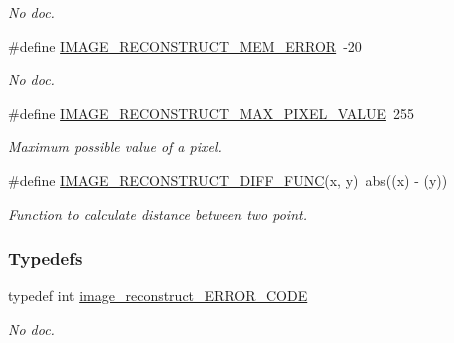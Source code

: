 \begin{DoxyCompactItemize}
\begin{DoxyCompactList}\small\item\em No doc. \end{DoxyCompactList}\item 
\hypertarget{a00013_a1c03d3ba5b3e6e762312da626f27927b}{\#define \hyperlink{a00013_a1c03d3ba5b3e6e762312da626f27927b}{I\-M\-A\-G\-E\-\_\-\-R\-E\-C\-O\-N\-S\-T\-R\-U\-C\-T\-\_\-\-M\-E\-M\-\_\-\-E\-R\-R\-O\-R}~-\/20}\label{a00013_a1c03d3ba5b3e6e762312da626f27927b}

\begin{DoxyCompactList}\small\item\em No doc. \end{DoxyCompactList}\item 
\hypertarget{a00013_abf3443d93974425a774dff64cbfbcdc6}{\#define \hyperlink{a00013_abf3443d93974425a774dff64cbfbcdc6}{I\-M\-A\-G\-E\-\_\-\-R\-E\-C\-O\-N\-S\-T\-R\-U\-C\-T\-\_\-\-M\-A\-X\-\_\-\-P\-I\-X\-E\-L\-\_\-\-V\-A\-L\-U\-E}~255}\label{a00013_abf3443d93974425a774dff64cbfbcdc6}

\begin{DoxyCompactList}\small\item\em Maximum possible value of a pixel. \end{DoxyCompactList}\item 
\#define \hyperlink{a00013_acd563962a2519e1a0f6db482b702e0f1}{I\-M\-A\-G\-E\-\_\-\-R\-E\-C\-O\-N\-S\-T\-R\-U\-C\-T\-\_\-\-D\-I\-F\-F\-\_\-\-F\-U\-N\-C}(x, y)~abs((x) -\/ (y))
\begin{DoxyCompactList}\small\item\em Function to calculate distance between two point. \end{DoxyCompactList}\end{DoxyCompactItemize}
\subsubsection*{Typedefs}
\begin{DoxyCompactItemize}
\item 
\hypertarget{a00013_a503a55637040f4b6244d1a6bee6c9f01}{typedef int \hyperlink{a00013_a503a55637040f4b6244d1a6bee6c9f01}{image\-\_\-reconstruct\-\_\-\-E\-R\-R\-O\-R\-\_\-\-C\-O\-D\-E}}\label{a00013_a503a55637040f4b6244d1a6bee6c9f01}

\begin{DoxyCompactList}\small\item\em No doc. \end{DoxyCompactList}\end{DoxyCompactItemize}
